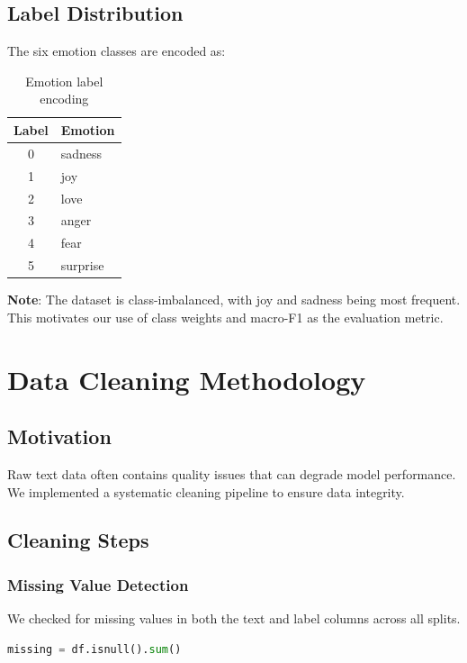 \documentclass[12pt,a4paper]{article}
\begin{document}
\subsection{Label Distribution}
The six emotion classes are encoded as:
\begin{table}[H]
\centering
\begin{tabular}{@{}cl@{}}
\toprule
\textbf{Label} & \textbf{Emotion} \\ \midrule
0 & sadness \\
1 & joy \\
2 & love \\
3 & anger \\
4 & fear \\
5 & surprise \\ \bottomrule
\end{tabular}
\caption{Emotion label encoding}
\label{tab:labels}
\end{table}

\textbf{Note}: The dataset is class-imbalanced, with joy and sadness being most frequent. This motivates our use of class weights and macro-F1 as the evaluation metric.

\section{Data Cleaning Methodology}

\subsection{Motivation}
Raw text data often contains quality issues that can degrade model performance. We implemented a systematic cleaning pipeline to ensure data integrity.

\subsection{Cleaning Steps}

\subsubsection{Missing Value Detection}
We checked for missing values in both the text and label columns across all splits.

\begin{lstlisting}[language=Python, caption={Missing value check}]
missing = df.isnull().sum()
\end{lstlisting}
\end{document}
